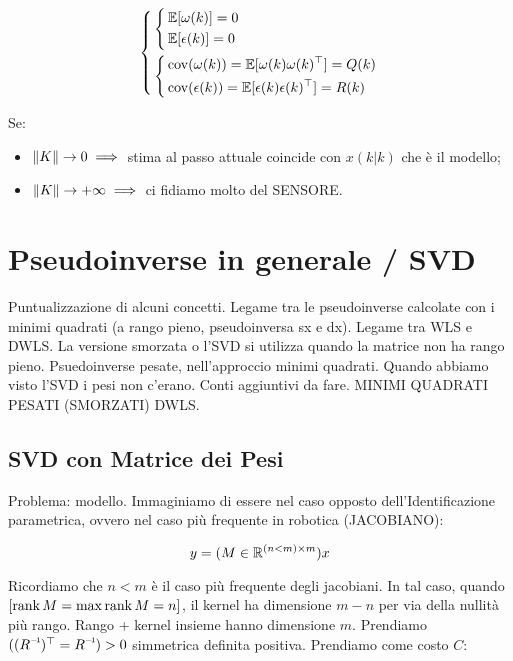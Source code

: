 \[
	\left\{
	\begin{aligned}
	&\left\{
	\begin{aligned}
	&\operatorname{\mathbb{E}}[\omega(k)]=0\\
	&\operatorname{\mathbb{E}}[\epsilon(k)]=0
	\end{aligned}
	\right.\\
	&\left\{
	\begin{aligned}
	&\operatorname{cov}(\omega(k)) = \operatorname{\mathbb{E}}[\omega(k)\omega(k)^\top] = Q(k)\\
	&\operatorname{cov}(\epsilon(k)) = \operatorname{\mathbb{E}}[\epsilon(k)\epsilon(k)^\top] = R(k)
	\end{aligned}
	\right.
	\end{aligned}
	\right.
\]

Se:

\begin{itemize}

\item{$\lVert K\rVert\to 0 \implies$} stima al passo attuale coincide con $x(k|k)$ che è il modello;
\item{$\lVert K\rVert\to+\infty\implies$} ci fidiamo molto del SENSORE.
\end{itemize}


\section{Pseudoinverse in generale / SVD}

Puntualizzazione di alcuni concetti. Legame tra le pseudoinverse calcolate con i minimi quadrati (a rango pieno, pseudoinversa sx e dx). Legame tra WLS e DWLS. La versione smorzata o l'SVD si utilizza quando la matrice non ha rango pieno. Psuedoinverse pesate, nell'approccio minimi quadrati. Quando abbiamo visto l'SVD i pesi non c'erano. Conti aggiuntivi da fare. MINIMI QUADRATI PESATI (SMORZATI) DWLS.

\subsection{SVD con Matrice dei Pesi}

Problema: modello. Immaginiamo di essere nel caso opposto dell'Identificazione parametrica, ovvero nel caso più frequente in robotica (JACOBIANO):

\[
	y=(M\in\mathbb{R}^{(n<m)\times m})x
\]

Ricordiamo che $n<m$ è il caso più frequente degli jacobiani. In tal caso, quando $[\operatorname{rank}{M}=\max\operatorname{rank}{M}=n]$, il kernel ha dimensione $m-n$ per via della nullità più rango. Rango + kernel insieme hanno dimensione $m$. Prendiamo $((\inv{R})^\top = \inv{R}) > 0$ simmetrica definita positiva. Prendiamo come costo $C$:

